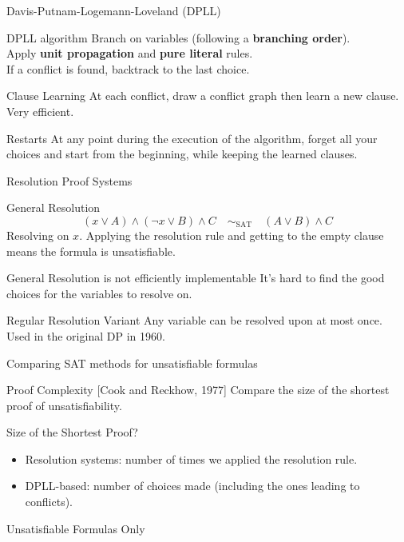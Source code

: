 \documentclass[page number]{beamer}
\begin{document}
\begin{frame}{Davis-Putnam-Logemann-Loveland (DPLL)}
  \begin{block}{DPLL algorithm}
    Branch on variables (following a \textbf{branching order}). \\
    Apply \textbf{unit propagation} and \textbf{pure literal} rules.\\
    If a conflict is found, backtrack to the last choice.
  \end{block}
  \vfill
  \begin{exampleblock}{Clause Learning}
    At each conflict, draw a conflict graph then learn a new clause.\\
    Very efficient.
  \end{exampleblock}
  \vfill
  \begin{exampleblock}{Restarts}
    At any point during the execution of the algorithm, forget all your choices and start from the beginning, while keeping the learned clauses.
  \end{exampleblock}
      
\end{frame}

\begin{frame}{Resolution Proof Systems}
  \begin{block}{General Resolution}
    $$(x \vee A) \wedge (\neg x\vee B) \wedge C \quad\sim_{\text{SAT}}\quad (A \vee B) \wedge C$$
    Resolving on $x$. Applying the resolution rule and getting to the empty clause means the formula is unsatisfiable.
  \end{block}
  \vfill
  \begin{alertblock}{General Resolution is not efficiently implementable}
    It's hard to find the good choices for the variables to resolve on.
  \end{alertblock}
  \vfill
  \begin{block}{Regular Resolution Variant}
    Any variable can be resolved upon at most once.\\
    Used in the original DP in 1960.
  \end{block}
\end{frame}

\begin{frame}{Comparing SAT methods for unsatisfiable formulas}
  \begin{block}{Proof Complexity [Cook and Reckhow, 1977]}
    Compare the size of the shortest proof of unsatisfiability.
  \end{block}
  \vfill
  \begin{block}{Size of the Shortest Proof?}
    \begin{itemize}
    \item Resolution systems: number of times we applied the resolution rule.
    \item DPLL-based: number of choices made (including the ones leading to conflicts).
    \end{itemize}
  \end{block}
  \vfill
  \begin{alertblock}{Unsatisfiable Formulas Only}
  \end{alertblock}

\end{frame}
\end{document}
